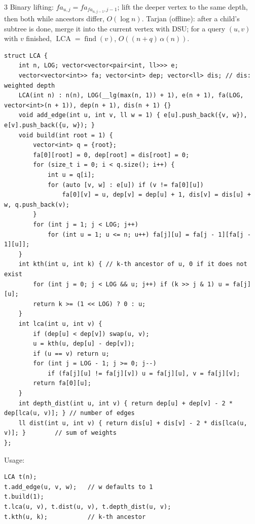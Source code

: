 \documentclass[8pt]{extarticle}
\begin{document}
\begin{multicols*}{3}
Binary lifting: $fa_{u,j} = fa_{fa_{u,j-1}, j-1}$; lift the deeper vertex to the same depth, then both while ancestors differ, $O(\log n)$. Tarjan (offline): after a child's subtree is done, merge it into the current vertex with DSU; for a query $(u, v)$ with $v$ finished, $\operatorname{LCA} = \operatorname{find}(v)$, $O((n + q)\,\alpha(n))$.

\begin{lstlisting}
struct LCA {
    int n, LOG; vector<vector<pair<int, ll>>> e;
    vector<vector<int>> fa; vector<int> dep; vector<ll> dis; // dis: weighted depth
    LCA(int n) : n(n), LOG(__lg(max(n, 1)) + 1), e(n + 1), fa(LOG, vector<int>(n + 1)), dep(n + 1), dis(n + 1) {}
    void add_edge(int u, int v, ll w = 1) { e[u].push_back({v, w}), e[v].push_back({u, w}); }
    void build(int root = 1) {
        vector<int> q = {root};
        fa[0][root] = 0, dep[root] = dis[root] = 0;
        for (size_t i = 0; i < q.size(); i++) {
            int u = q[i];
            for (auto [v, w] : e[u]) if (v != fa[0][u])
                fa[0][v] = u, dep[v] = dep[u] + 1, dis[v] = dis[u] + w, q.push_back(v);
        }
        for (int j = 1; j < LOG; j++)
            for (int u = 1; u <= n; u++) fa[j][u] = fa[j - 1][fa[j - 1][u]];
    }
    int kth(int u, int k) { // k-th ancestor of u, 0 if it does not exist
        for (int j = 0; j < LOG && u; j++) if (k >> j & 1) u = fa[j][u];
        return k >= (1 << LOG) ? 0 : u;
    }
    int lca(int u, int v) {
        if (dep[u] < dep[v]) swap(u, v);
        u = kth(u, dep[u] - dep[v]);
        if (u == v) return u;
        for (int j = LOG - 1; j >= 0; j--)
            if (fa[j][u] != fa[j][v]) u = fa[j][u], v = fa[j][v];
        return fa[0][u];
    }
    int depth_dist(int u, int v) { return dep[u] + dep[v] - 2 * dep[lca(u, v)]; } // number of edges
    ll dist(int u, int v) { return dis[u] + dis[v] - 2 * dis[lca(u, v)]; }        // sum of weights
};
\end{lstlisting}

Usage:

\begin{lstlisting}
LCA t(n);
t.add_edge(u, v, w);   // w defaults to 1
t.build(1);
t.lca(u, v), t.dist(u, v), t.depth_dist(u, v);
t.kth(u, k);           // k-th ancestor
\end{lstlisting}


\end{multicols*}
\end{document}
